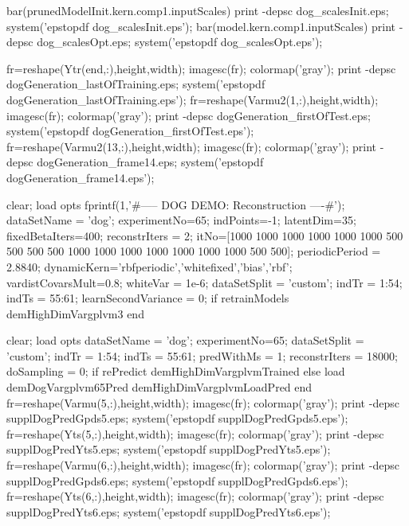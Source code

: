 \documentclass{article} %
\newenvironment{matlab}{\comment}{\endcomment}
\begin{document}
\begin{matlab}
bar(prunedModelInit.kern.comp{1}.inputScales)
print -depsc dog_scalesInit.eps; system('epstopdf dog_scalesInit.eps');
bar(model.kern.comp{1}.inputScales)
print -depsc dog_scalesOpt.eps; system('epstopdf dog_scalesOpt.eps');

fr=reshape(Ytr(end,:),height,width); imagesc(fr); colormap('gray'); %
print -depsc dogGeneration_lastOfTraining.eps; system('epstopdf dogGeneration_lastOfTraining.eps');
fr=reshape(Varmu2(1,:),height,width); imagesc(fr); colormap('gray');  %
print -depsc dogGeneration_firstOfTest.eps; system('epstopdf dogGeneration_firstOfTest.eps');
fr=reshape(Varmu2(13,:),height,width); imagesc(fr); colormap('gray'); %
print -depsc dogGeneration_frame14.eps; system('epstopdf dogGeneration_frame14.eps');




clear; load opts
fprintf(1,'\n\n#-----  DOG DEMO: Reconstruction ----#\n');
dataSetName = 'dog';
experimentNo=65;
indPoints=-1; latentDim=35;
fixedBetaIters=400;
reconstrIters = 2;
itNo=[1000 1000 1000 1000 1000 1000 500 500 500 500 1000 1000 1000 1000 1000 1000 1000 500 500]; %
periodicPeriod = 2.8840;
dynamicKern={'rbfperiodic','whitefixed','bias','rbf'};
vardistCovarsMult=0.8;
whiteVar = 1e-6;
dataSetSplit = 'custom';
indTr = 1:54;
indTs = 55:61;
learnSecondVariance = 0;
if retrainModels
    demHighDimVargplvm3
end


clear; load opts
dataSetName = 'dog';
experimentNo=65;
dataSetSplit = 'custom';
indTr = 1:54; indTs = 55:61;
predWithMs = 1; %
reconstrIters = 18000; 
doSampling = 0;
if rePredict
    demHighDimVargplvmTrained
else
    load demDogVargplvm65Pred
    demHighDimVargplvmLoadPred
end
fr=reshape(Varmu(5,:),height,width); imagesc(fr); colormap('gray'); 
print -depsc supplDogPredGpds5.eps; system('epstopdf supplDogPredGpds5.eps');
fr=reshape(Yts(5,:),height,width); imagesc(fr); colormap('gray'); 
print -depsc supplDogPredYts5.eps; system('epstopdf supplDogPredYts5.eps');
fr=reshape(Varmu(6,:),height,width); imagesc(fr); colormap('gray'); 
print -depsc supplDogPredGpds6.eps; system('epstopdf supplDogPredGpds6.eps');
fr=reshape(Yts(6,:),height,width); imagesc(fr); colormap('gray'); 
print -depsc supplDogPredYts6.eps; system('epstopdf supplDogPredYts6.eps');


\end{matlab}
\end{document}

